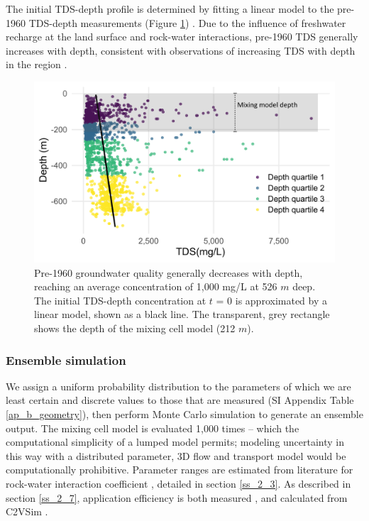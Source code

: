 The initial TDS-depth profile is determined by fitting a linear model to the pre-1960 TDS-depth measurements (Figure \ref{fig:predev_tds_bc}) \citep{CSWRCB}. Due to the influence of freshwater recharge at the land surface and rock-water interactions, pre-1960 TDS generally increases with depth, consistent with observations of increasing TDS with depth in the region \citep{Kang2016, Kharaka1992, Program2010}. \\  

\begin{figure}[H]
	\includegraphics[width=\textwidth]{ch3_figs/predev_tds_bc.pdf}
	\caption{Pre-1960 groundwater quality generally decreases with depth, reaching an average concentration of 1,000 mg/L at 526 $m$ deep. The initial TDS-depth concentration at $t$ = 0 is approximated by a linear model, shown as a black line. The transparent, grey rectangle shows the depth of the mixing cell model (212 $m$).}
	\label{fig:predev_tds_bc}
\end{figure}


%
%
\subsubsection{Ensemble simulation}
\label{ss_2_9}

We assign a uniform probability distribution to the parameters of which we are least certain and discrete values to those that are measured (SI Appendix Table \ref{ap_b_geometry}), then perform Monte Carlo simulation to generate an ensemble output. The mixing cell model is evaluated 1,000 times -- which the computational simplicity of a lumped model permits; modeling uncertainty in this way with a distributed parameter, 3D flow and transport model would be computationally prohibitive. Parameter ranges are estimated from literature for rock-water interaction coefficient \citep{Williamson1989, Kang2016}, detailed in section \ref{ss_2_3}. As described in section \ref{ss_2_7}, application efficiency is both measured \citep{sandoval2013spatial}, and calculated from C2VSim \citep{Brush2013}.  

